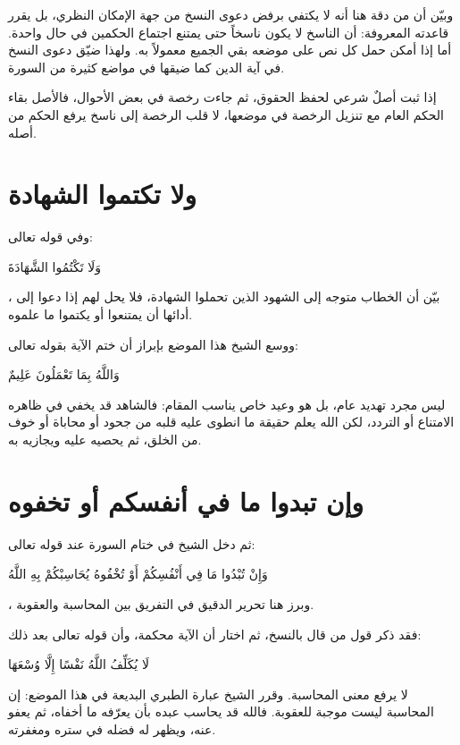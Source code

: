 وبيّن أن من دقة  هنا أنه لا يكتفي برفض دعوى النسخ من جهة الإمكان النظري، بل يقرر قاعدته المعروفة: أن الناسخ لا يكون ناسخاً حتى يمتنع اجتماع الحكمين في حال واحدة. أما إذا أمكن حمل كل نص على موضعه بقي الجميع معمولاً به. ولهذا ضيّق دعوى النسخ في آية الدين كما ضيقها في مواضع كثيرة من السورة.

\begin{fawaid}
إذا ثبت أصلٌ شرعي لحفظ الحقوق، ثم جاءت رخصة في بعض الأحوال، فالأصل بقاء الحكم العام مع تنزيل الرخصة في موضعها، لا قلب الرخصة إلى ناسخ يرفع الحكم من أصله.
\end{fawaid}

\section{ولا تكتموا الشهادة}
وفي قوله تعالى: \begin{ayah}وَلَا تَكْتُمُوا الشَّهَادَةَ\end{ayah}، بيّن  أن الخطاب متوجه إلى الشهود الذين تحملوا الشهادة، فلا يحل لهم إذا دعوا إلى أدائها أن يمتنعوا أو يكتموا ما علموه.

ووسع الشيخ هذا الموضع بإبراز أن ختم الآية بقوله تعالى: \begin{ayah}وَاللَّهُ بِمَا تَعْمَلُونَ عَلِيمٌ\end{ayah} ليس مجرد تهديد عام، بل هو وعيد خاص يناسب المقام: فالشاهد قد يخفي في ظاهره الامتناع أو التردد، لكن الله يعلم حقيقة ما انطوى عليه قلبه من جحود أو محاباة أو خوف من الخلق، ثم يحصيه عليه ويجازيه به.

\section{وإن تبدوا ما في أنفسكم أو تخفوه}
ثم دخل الشيخ في ختام السورة عند قوله تعالى: \begin{ayah}وَإِنْ تُبْدُوا مَا فِي أَنْفُسِكُمْ أَوْ تُخْفُوهُ يُحَاسِبْكُمْ بِهِ اللَّهُ\end{ayah}، وبرز هنا تحرير  الدقيق في التفريق بين المحاسبة والعقوبة.

فقد ذكر قول من قال بالنسخ، ثم اختار أن الآية محكمة، وأن قوله تعالى بعد ذلك: \begin{ayah}لَا يُكَلِّفُ اللَّهُ نَفْسًا إِلَّا وُسْعَهَا\end{ayah} لا يرفع معنى المحاسبة. وقرر الشيخ عبارة الطبري البديعة في هذا الموضع: إن المحاسبة ليست موجبة للعقوبة. فالله قد يحاسب عبده بأن يعرّفه ما أخفاه، ثم يعفو عنه، ويظهر له فضله في ستره ومغفرته.


